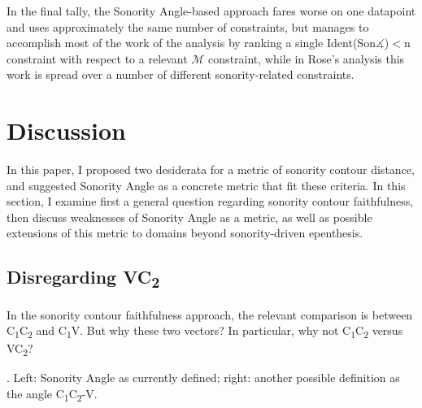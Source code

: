 \documentclass[12pt]{article}
\begin{document}
In the final tally, the {\sc Sonority Angle}-based approach fares worse on one datapoint and uses approximately the same number of constraints, but manages to accomplish most of the work of the analysis by ranking a single {\sc Ident(Son$\measuredangle$)}$<$n constraint with respect to a relevant $\mathcal{M}$ constraint, while in Rose's analysis this work is spread over a number of different sonority-related constraints.

\section{Discussion} \label{issues}

In this paper, I proposed two desiderata for a metric of sonority contour distance, and suggested {\sc Sonority Angle} as a concrete metric that fit these criteria. In this section, I examine first a general question regarding sonority contour faithfulness, then discuss weaknesses of {\sc Sonority Angle} as a metric, as well as possible extensions of this metric to domains beyond sonority-driven epenthesis.

\subsection{Disregarding VC\textsubscript{2}} 

In the sonority contour faithfulness approach, the relevant comparison is between C\textsubscript{1}C\textsubscript{2} and C\textsubscript{1}V. But why these two vectors? In particular, why not C\textsubscript{1}C\textsubscript{2} versus VC\textsubscript{2}?

\ex. Left: {\sc Sonority Angle} as currently defined; right: another possible definition as the angle C\textsubscript{1}C\textsubscript{2}-V.

\begin{center}
\end{center}
\end{document}
